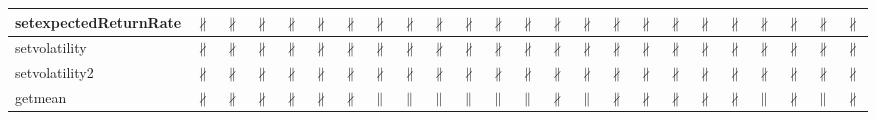 \documentclass[10pt]{article}
\begin{document}
\begin{longtable}{|l|l|l|l|l|l|l|l|l|l|l|l|l|l|l|l|l|l|l|l|l|l|l|l|}
\hline
setexpectedReturnRate&{\color{BrickRed}$\nparallel$}&{\color{BrickRed}$\nparallel$}&{\color{BrickRed}$\nparallel$}&{\color{BrickRed}$\nparallel$}&{\color{BrickRed}$\nparallel$}&{\color{BrickRed}$\nparallel$}&{\color{BrickRed}$\nparallel$}&{\color{BrickRed}$\nparallel$}&{\color{BrickRed}$\nparallel$}&{\color{BrickRed}$\nparallel$}&{\color{BrickRed}$\nparallel$}&{\color{BrickRed}$\nparallel$}&{\color{BrickRed}$\nparallel$}&{\color{BrickRed}$\nparallel$}&{\color{BrickRed}$\nparallel$}&{\color{BrickRed}$\nparallel$}&{\color{BrickRed}$\nparallel$}&{\color{BrickRed}$\nparallel$}&{\color{BrickRed}$\nparallel$}&{\color{BrickRed}$\nparallel$}&{\color{BrickRed}$\nparallel$}&{\color{BrickRed}$\nparallel$}&{\color{BrickRed}$\nparallel$}\\
\hline
setvolatility&{\color{BrickRed}$\nparallel$}&{\color{BrickRed}$\nparallel$}&{\color{BrickRed}$\nparallel$}&{\color{BrickRed}$\nparallel$}&{\color{BrickRed}$\nparallel$}&{\color{BrickRed}$\nparallel$}&{\color{BrickRed}$\nparallel$}&{\color{BrickRed}$\nparallel$}&{\color{BrickRed}$\nparallel$}&{\color{BrickRed}$\nparallel$}&{\color{BrickRed}$\nparallel$}&{\color{BrickRed}$\nparallel$}&{\color{BrickRed}$\nparallel$}&{\color{BrickRed}$\nparallel$}&{\color{BrickRed}$\nparallel$}&{\color{BrickRed}$\nparallel$}&{\color{BrickRed}$\nparallel$}&{\color{BrickRed}$\nparallel$}&{\color{BrickRed}$\nparallel$}&{\color{BrickRed}$\nparallel$}&{\color{BrickRed}$\nparallel$}&{\color{BrickRed}$\nparallel$}&{\color{BrickRed}$\nparallel$}\\
\hline
setvolatility2&{\color{BrickRed}$\nparallel$}&{\color{BrickRed}$\nparallel$}&{\color{BrickRed}$\nparallel$}&{\color{BrickRed}$\nparallel$}&{\color{BrickRed}$\nparallel$}&{\color{BrickRed}$\nparallel$}&{\color{BrickRed}$\nparallel$}&{\color{BrickRed}$\nparallel$}&{\color{BrickRed}$\nparallel$}&{\color{BrickRed}$\nparallel$}&{\color{BrickRed}$\nparallel$}&{\color{BrickRed}$\nparallel$}&{\color{BrickRed}$\nparallel$}&{\color{BrickRed}$\nparallel$}&{\color{BrickRed}$\nparallel$}&{\color{BrickRed}$\nparallel$}&{\color{BrickRed}$\nparallel$}&{\color{BrickRed}$\nparallel$}&{\color{BrickRed}$\nparallel$}&{\color{BrickRed}$\nparallel$}&{\color{BrickRed}$\nparallel$}&{\color{BrickRed}$\nparallel$}&{\color{BrickRed}$\nparallel$}\\
\hline
getmean&{\color{BrickRed}$\nparallel$}&{\color{BrickRed}$\nparallel$}&{\color{BrickRed}$\nparallel$}&{\color{BrickRed}$\nparallel$}&{\color{BrickRed}$\nparallel$}&{\color{BrickRed}$\nparallel$}&{\color{blue}$\parallel$}&{\color{blue}$\parallel$}&{\color{blue}$\parallel$}&{\color{blue}$\parallel$}&{\color{blue}$\parallel$}&{\color{blue}$\parallel$}&{\color{BrickRed}$\nparallel$}&{\color{blue}$\parallel$}&{\color{BrickRed}$\nparallel$}&{\color{BrickRed}$\nparallel$}&{\color{BrickRed}$\nparallel$}&{\color{BrickRed}$\nparallel$}&{\color{BrickRed}$\nparallel$}&{\color{blue}$\parallel$}&{\color{BrickRed}$\nparallel$}&{\color{blue}$\parallel$}&{\color{BrickRed}$\nparallel$}\\

\end{longtable}
\end{document}
